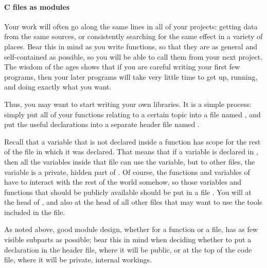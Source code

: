 \documentclass[12pt]{article}
\begin{document}
\paragraph{C files as modules}
Your work will often go along the same lines in all of your projects:
getting data from the same sources, or consistently searching for the
same effect in a variety of places. Bear this in mind as you write
functions, so that they are as general and self-contained as possible,
so you will be able to call them from your next project. The wisdom of
the ages shows that if you are careful writing your first few programs,
then your later programs will take very little time to get up, running,
and doing exactly what you want.

Thus, you may want to start writing your own libraries. It is a simple
process: simply put all of your functions relating to a certain topic
into a file named , and put the useful declarations
into a separate header file named .

Recall that a variable that is not declared inside a function has scope
for the rest of the file in which it was declared. That means that if a
variable is declared in , then all the variables inside
that file can use the variable, but to other  files, the
variable is a private, hidden part of . Of course, the
functions and variables of  have to interact with the
rest of the world somehow, so those variables and functions that should
be publicly available should be put in a file . You
will  at the head of ,
and also at the head of all other files that may want to use the tools
included in the  file.

As noted above, good module design, whether for a function or a file, has as few
visible subparts as possible; bear this in mind when deciding whether to put a
declaration in the header file, where it will be public, or at the top of the code file,
where it will be private, internal workings.
\end{document}
